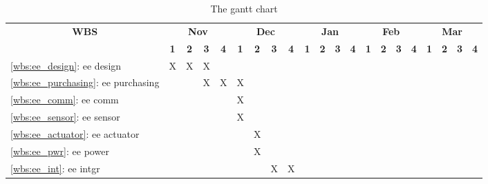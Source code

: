 \documentclass[a4paper, 10pt, twocolumn, titlepage]{article}
\newcommand{\head}[1]{\textnormal{\textbf{#1}}} %
\begin{document}
\begin{table}[!tb]
\centering
\caption{The gantt chart}
  \begin{tabular}{l cccc cccc cccc cccc cccc}
    \toprule[1.5pt]
    
    \multicolumn{1}{c}{\head{WBS}} &
    \multicolumn{4}{c}{\head{Nov}} &
    \multicolumn{4}{c}{\head{Dec}} &
    \multicolumn{4}{c}{\head{Jan}} &
    \multicolumn{4}{c}{\head{Feb}} &
    \multicolumn{4}{c}{\head{Mar}} \\
    
    & \head{1} & \head{2} & \head{3} & \head{4} &
      \head{1} & \head{2} & \head{3} & \head{4} &
      \head{1} & \head{2} & \head{3} & \head{4} &
      \head{1} & \head{2} & \head{3} & \head{4} &
      \head{1} & \head{2} & \head{3} & \head{4} \\
    
    \cmidrule(r){1-1} \cmidrule(l){2-5} \cmidrule(l){6-9} \cmidrule(l){10-13} \cmidrule(l){14-17} \cmidrule(l){18-21}
    
    \ref{wbs:ee_design}: ee design &
     X & X & X &   &
       &   &   &   &
       &   &   &   &
       &   &   &   &
       &   &   &   \\
     
    \ref{wbs:ee_purchasing}: ee purchasing &
       &   & X & X &
     X &   &   &   &
       &   &   &   &
       &   &   &   &
       &   &   &   \\
    
    \midrule[1.0pt]
    \ref{wbs:ee_comm}: ee comm &
       &   &   &   &
     X &   &   &   &
       &   &   &   &
       &   &   &   &
       &   &   &   \\
    
    \ref{wbs:ee_sensor}: ee sensor &
       &   &   &   &
     X &   &   &   &
       &   &   &   &
       &   &   &   &
       &   &   &   \\
    
    \midrule[1.0pt]
    \ref{wbs:ee_actuator}: ee actuator &
       &   &   &   &
       & X &   &   &
       &   &   &   &
       &   &   &   &
       &   &   &   \\
    
    \ref{wbs:ee_pwr}: ee power &
       &   &   &   &
       & X &   &   &
       &   &   &   &
       &   &   &   &
       &   &   &   \\
    
    \midrule[1.0pt]
    \ref{wbs:ee_int}: ee intgr &
       &   &   &   &
       &   & X & X &
       &   &   &   &
       &   &   &   &
       &   &   &   \\
       

\end{tabular}
\end{table}
\end{document}
